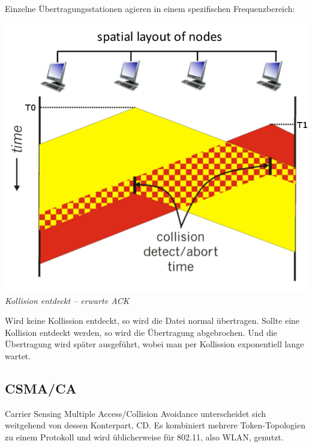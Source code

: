 \documentclass{article}
\begin{document}
    Einzelne Übertragungsstationen agieren in einem spezifischen Frequenzbereich:
    \begin{center}
        \includegraphics[width=\textwidth]{CSMACD.png}\\
        \textit{Kollision entdeckt -- erwarte ACK}
    \end{center}
    
    Wird keine Kollission entdeckt, so wird die Datei normal übertragen. Sollte eine Kollision entdeckt werden, so wird die Übertragung abgebrochen. Und die Übertragung wird später ausgeführt, wobei man per Kollission exponentiell lange wartet.
    
    \subsection{CSMA/CA}
    Carrier Sensing Multiple Access/Collision Avoidance unterscheidet sich weitgehend von dessen Konterpart, CD.
    Es kombiniert mehrere Token-Topologien zu einem Protokoll und wird üblicherweise für 802.11, also WLAN, genutzt.
    
\end{document}
